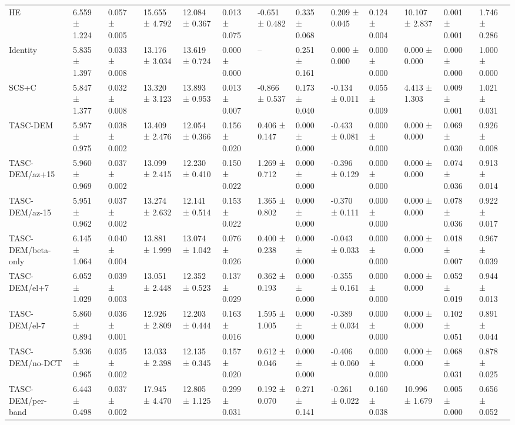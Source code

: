 \begin{table}[t]
\begin{tabular}{lllllllllllll}
HE & 6.559 ± 1.224 & 0.057 ± 0.005 & 15.655 ± 4.792 & 12.084 ± 0.367 & 0.013 ± 0.075 & -0.651 ± 0.482 & 0.335 ± 0.068 & 0.209 ± 0.045 & 0.124 ± 0.004 & 10.107 ± 2.837 & 0.001 ± 0.001 & 1.746 ± 0.286 \\
Identity & 5.835 ± 1.397 & 0.033 ± 0.008 & 13.176 ± 3.034 & 13.619 ± 0.724 & 0.000 ± 0.000 & -- & 0.251 ± 0.161 & 0.000 ± 0.000 & 0.000 ± 0.000 & 0.000 ± 0.000 & 0.000 ± 0.000 & 1.000 ± 0.000 \\
SCS+C & 5.847 ± 1.377 & 0.032 ± 0.008 & 13.320 ± 3.123 & 13.893 ± 0.953 & 0.013 ± 0.007 & -0.866 ± 0.537 & 0.173 ± 0.040 & -0.134 ± 0.011 & 0.055 ± 0.009 & 4.413 ± 1.303 & 0.009 ± 0.001 & 1.021 ± 0.031 \\
TASC-DEM & 5.957 ± 0.975 & 0.038 ± 0.002 & 13.409 ± 2.476 & 12.054 ± 0.366 & 0.156 ± 0.020 & 0.406 ± 0.147 & 0.000 ± 0.000 & -0.433 ± 0.081 & 0.000 ± 0.000 & 0.000 ± 0.000 & 0.069 ± 0.030 & 0.926 ± 0.008 \\
TASC-DEM/az+15 & 5.960 ± 0.969 & 0.037 ± 0.002 & 13.099 ± 2.415 & 12.230 ± 0.410 & 0.150 ± 0.022 & 1.269 ± 0.712 & 0.000 ± 0.000 & -0.396 ± 0.129 & 0.000 ± 0.000 & 0.000 ± 0.000 & 0.074 ± 0.036 & 0.913 ± 0.014 \\
TASC-DEM/az-15 & 5.951 ± 0.962 & 0.037 ± 0.002 & 13.274 ± 2.632 & 12.141 ± 0.514 & 0.153 ± 0.022 & 1.365 ± 0.802 & 0.000 ± 0.000 & -0.370 ± 0.111 & 0.000 ± 0.000 & 0.000 ± 0.000 & 0.078 ± 0.036 & 0.922 ± 0.017 \\
TASC-DEM/beta-only & 6.145 ± 1.064 & 0.040 ± 0.004 & 13.881 ± 1.999 & 13.074 ± 1.042 & 0.076 ± 0.026 & 0.400 ± 0.238 & 0.000 ± 0.000 & -0.043 ± 0.033 & 0.000 ± 0.000 & 0.000 ± 0.000 & 0.018 ± 0.007 & 0.967 ± 0.039 \\
TASC-DEM/el+7 & 6.052 ± 1.029 & 0.039 ± 0.003 & 13.051 ± 2.448 & 12.352 ± 0.523 & 0.137 ± 0.029 & 0.362 ± 0.193 & 0.000 ± 0.000 & -0.355 ± 0.161 & 0.000 ± 0.000 & 0.000 ± 0.000 & 0.052 ± 0.019 & 0.944 ± 0.013 \\
TASC-DEM/el-7 & 5.860 ± 0.894 & 0.036 ± 0.001 & 12.926 ± 2.809 & 12.203 ± 0.444 & 0.163 ± 0.016 & 1.595 ± 1.005 & 0.000 ± 0.000 & -0.389 ± 0.034 & 0.000 ± 0.000 & 0.000 ± 0.000 & 0.102 ± 0.051 & 0.891 ± 0.044 \\
TASC-DEM/no-DCT & 5.936 ± 0.965 & 0.035 ± 0.002 & 13.033 ± 2.398 & 12.135 ± 0.345 & 0.157 ± 0.020 & 0.612 ± 0.046 & 0.000 ± 0.000 & -0.406 ± 0.060 & 0.000 ± 0.000 & 0.000 ± 0.000 & 0.068 ± 0.031 & 0.878 ± 0.025 \\
TASC-DEM/per-band & 6.443 ± 0.498 & 0.037 ± 0.002 & 17.945 ± 4.470 & 12.805 ± 1.125 & 0.299 ± 0.031 & 0.192 ± 0.070 & 0.271 ± 0.141 & -0.261 ± 0.022 & 0.160 ± 0.038 & 10.996 ± 1.679 & 0.005 ± 0.000 & 0.656 ± 0.052 \\

\end{tabular}
\end{table}

